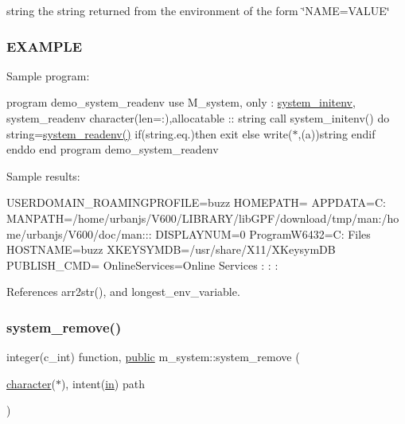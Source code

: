 string the string returned from the environment of the form \char`\"{}\+N\+A\+M\+E=\+V\+A\+L\+U\+E\char`\"{}

\subsubsection*{E\+X\+A\+M\+P\+LE}

Sample program\+:

program demo\+\_\+system\+\_\+readenv use M\+\_\+system, only \+: \hyperlink{interfacem__system_1_1system__initenv}{system\+\_\+initenv}, system\+\_\+readenv character(len=\+:),allocatable \+:\+: string call system\+\_\+initenv() do string=\hyperlink{namespacem__system_ae0e43010a82a6a25402568ccb326322d}{system\+\_\+readenv()} if(string.\+eq.\textquotesingle{}\textquotesingle{})then exit else write($\ast$,\textquotesingle{}(a)\textquotesingle{})string endif enddo end program demo\+\_\+system\+\_\+readenv

Sample results\+:

U\+S\+E\+R\+D\+O\+M\+A\+I\+N\+\_\+\+R\+O\+A\+M\+I\+N\+G\+P\+R\+O\+F\+I\+LE=buzz H\+O\+M\+E\+P\+A\+TH= A\+P\+P\+D\+A\+TA=C\+: M\+A\+N\+P\+A\+TH=/home/urbanjs/\+V600/\+L\+I\+B\+R\+A\+R\+Y/lib\+G\+P\+F/download/tmp/man\+:/home/urbanjs/\+V600/doc/man\+:\+:\+: D\+I\+S\+P\+L\+A\+Y\+N\+UM=0 Program\+W6432=C\+: Files H\+O\+S\+T\+N\+A\+ME=buzz X\+K\+E\+Y\+S\+Y\+M\+DB=/usr/share/\+X11/\+X\+Keysym\+DB P\+U\+B\+L\+I\+S\+H\+\_\+\+C\+MD= Online\+Services=Online Services \+: \+: \+: 

References arr2str(), and longest\+\_\+env\+\_\+variable.

\mbox{\label{namespacem__system_a730ae64294e3cd73bde8f0c63cdf9972}} 
\subsubsection{\texorpdfstring{system\+\_\+remove()}{system\_remove()}}
{\footnotesize\ttfamily integer(c\+\_\+int) function, \hyperlink{M__stopwatch_83_8txt_a2f74811300c361e53b430611a7d1769f}{public} m\+\_\+system\+::system\+\_\+remove (\begin{DoxyParamCaption}\item[{\hyperlink{option__stopwatch_83_8txt_abd4b21fbbd175834027b5224bfe97e66}{character}($\ast$), intent(\hyperlink{M__journal_83_8txt_afce72651d1eed785a2132bee863b2f38}{in})}]{path }\end{DoxyParamCaption})}



